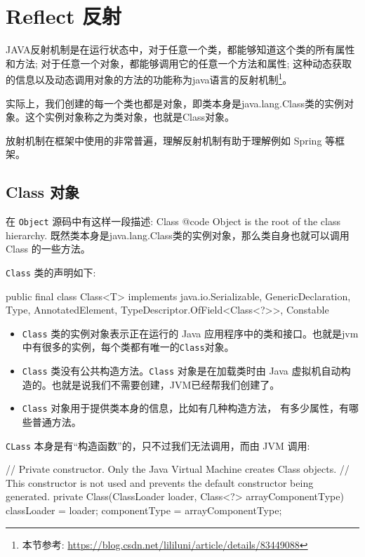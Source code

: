 \section{Reflect 反射}

JAVA反射机制是在运行状态中，对于任意一个类，都能够知道这个类的所有属性和方法; 对于任意一个对象，都能够调用它的任意一个方法和属性; 这种动态获取的信息以及动态调用对象的方法的功能称为java语言的反射机制\footnote{本节参考: \url{https://blog.csdn.net/lililuni/article/details/83449088}}。

实际上，我们创建的每一个类也都是对象，即类本身是java.lang.Class类的实例对象。这个实例对象称之为类对象，也就是Class对象。

放射机制在框架中使用的非常普遍，理解反射机制有助于理解例如 Spring 等框架。

\subsection{Class 对象}

在 \texttt{Object} 源码中有这样一段描述: Class {@code Object} is the root of the class hierarchy. 既然类本身是java.lang.Class类的实例对象，那么类自身也就可以调用 Class 的一些方法。

\texttt{Class} 类的声明如下:

\begin{Java}
public final class Class<T> implements java.io.Serializable, GenericDeclaration, Type, AnnotatedElement, TypeDescriptor.OfField<Class<?>>, Constable
\end{Java}

\begin{itemize}
    \item \texttt{Class} 类的实例对象表示正在运行的 Java 应用程序中的类和接口。也就是jvm中有很多的实例，每个类都有唯一的\texttt{Class}对象。
    \item \texttt{Class} 类没有公共构造方法。\texttt{Class} 对象是在加载类时由 Java 虚拟机自动构造的。也就是说我们不需要创建，JVM已经帮我们创建了。
    \item \texttt{Class} 对象用于提供类本身的信息，比如有几种构造方法， 有多少属性，有哪些普通方法。
\end{itemize}

\texttt{CLass} 本身是有``构造函数''的，只不过我们无法调用，而由 JVM 调用:

\begin{Java}
// Private constructor. Only the Java Virtual Machine creates Class objects.
// This constructor is not used and prevents the default constructor being generated.
private Class(ClassLoader loader, Class<?> arrayComponentType) {
    classLoader = loader;
    componentType = arrayComponentType;
}
\end{Java}

